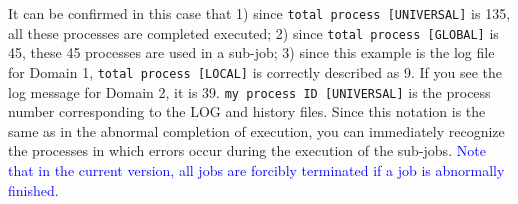 It can be confirmed in this case that 1) since \verb|total process [UNIVERSAL]| is 135, all these processes are completed executed; 2) since \verb|total process [GLOBAL]| is 45, these 45 processes are used in a sub-job; 3) since this example is the log file for Domain 1,  \verb|total process [LOCAL]| is correctly described as 9. If you see the log message for Domain 2,  it is 39. \verb|my process ID [UNIVERSAL]|  is the process number  corresponding to the LOG and history files. Since this notation is the same as in the abnormal completion of execution, you can immediately recognize the processes in which errors occur during the execution of the sub-jobs. \textcolor{blue}{Note that in the current version, all jobs are forcibly terminated if a job is abnormally finished.} 




